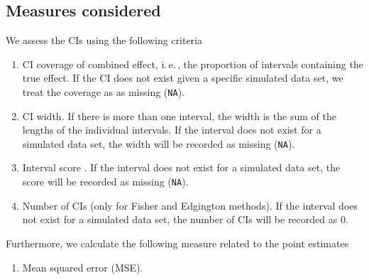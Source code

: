 \documentclass[letterpaper, 12pt]{article}
\newcommand{\ie}{{i.\,e.\,}}
\begin{document}
\subsection{Measures considered} \label{sec:meas}

We assess the CIs using the following criteria
\begin{enumerate}
  \item CI coverage of combined effect, \ie, the proportion of intervals
    containing the true effect. If the CI does not exist given a specific
    simulated data set, we treat the coverage as as missing (\texttt{NA}).
  \item CI width. If there is more than one interval, the width is the sum of
    the lengths of the individual intervals. If the interval does not exist for
    a simulated data set, the width will be recorded as missing (\texttt{NA}).
  \item Interval score \citep{Gnei:Raft:07}. If the interval does not exist for
    a simulated data set, the score will be recorded as missing (\texttt{NA}).
  \item Number of CIs (only for Fisher and Edgington methods). If the interval
  does not exist for a simulated data set, the number of CIs will be recorded as
  0. %
\end{enumerate}

Furthermore, we calculate the following measure related to the point estimates

\begin{enumerate}
  \item Mean squared error (MSE).
\end{enumerate}
\end{document}
